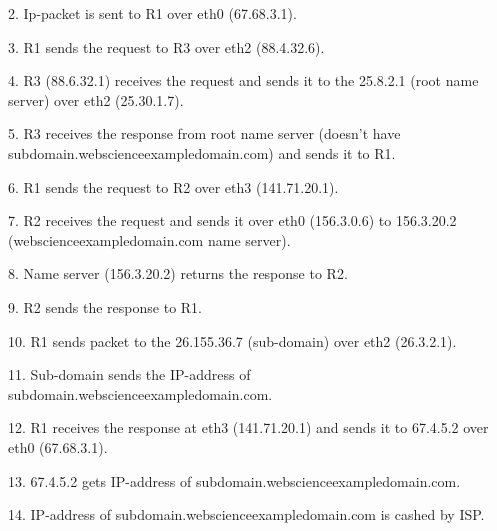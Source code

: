 \documentclass{WeSTassignment}
\begin{document}
2. Ip-packet is sent to R1 over eth0 (67.68.3.1).

3. R1 sends the request to R3 over eth2 (88.4.32.6).

4. R3 (88.6.32.1) receives the request and sends it to the 25.8.2.1 (root name server) over eth2 (25.30.1.7).

5. R3 receives the response from root name server (doesn’t have subdomain.webscienceexampledomain.com) and sends it to R1.

6. R1 sends the request to R2 over eth3 (141.71.20.1).

7. R2 receives the request and sends it over eth0 (156.3.0.6) to 156.3.20.2 (webscienceexampledomain.com name server).

8. Name server (156.3.20.2) returns the response to R2.

9. R2 sends the response to R1.

10. R1 sends packet to the 26.155.36.7 (sub-domain) over eth2 (26.3.2.1).

11. Sub-domain sends the IP-address of subdomain.webscienceexampledomain.com. 

12. R1 receives the response at eth3  (141.71.20.1) and sends it to 67.4.5.2 over eth0 (67.68.3.1).

13. 67.4.5.2 gets IP-address of subdomain.webscienceexampledomain.com.

14. IP-address of subdomain.webscienceexampledomain.com is cashed by ISP.




\makefooter
\end{document}
